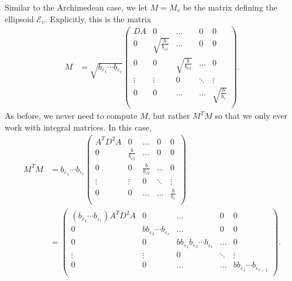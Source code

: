 Similar to the Archimedean case, we let $M=M_v$ be the matrix defining the ellipsoid $\mathcal{E}_{v}$. Explicitly, this is the matrix
\begin{align*}
M &=\sqrt{b_{\varepsilon_1}\cdots b_{\varepsilon_r}}\begin{pmatrix}
	DA & 0 & \dots & 0 & 0\\
	0 & \sqrt{\frac{b}{b_{\varepsilon 1}}} & \dots & 0 & 0\\
	0 & 0  & \sqrt{\frac{b}{b_{\varepsilon 2}}} & \dots & 0\\
	\vdots & \vdots &0 &  \ddots & \vdots\\ 
	0 & 0 & \dots & \dots & \sqrt{\frac{b}{b_{\varepsilon}}} \\
	\end{pmatrix}.
\end{align*}	
As before, we never need to compute $M$, but rather $M^TM$ so that we only ever work with integral matrices. In this case, 
\begin{align*}
M^TM &= b_{\varepsilon_1}\cdots b_{\varepsilon_r}\begin{pmatrix}
	A^TD^2A & 0 & \dots & 0 & 0\\
	0 & \frac{b}{b_{\varepsilon 1}} & \dots & 0 & 0\\
	0 & 0  & \frac{b}{b_{\varepsilon 2}} & \dots & 0\\
	\vdots & \vdots &0 &  \ddots & \vdots\\ 
	0 & 0 & \dots & \dots & \frac{b}{b_{\varepsilon}} \\
	\end{pmatrix}\\
	& = \begin{pmatrix}
	(b_{\varepsilon_1}\cdots b_{\varepsilon_r})A^TD^2A & 0 & \dots & 0 & 0\\
	0 & b b_{\varepsilon_2}\cdots b_{\varepsilon_r} & \dots & 0 & 0\\
	0 & 0  & bb_{\varepsilon_1}b_{\varepsilon_3}\cdots b_{\varepsilon_r} & \dots & 0\\
	\vdots & \vdots &0 &  \ddots & \vdots\\ 
	0 & 0 & \dots & \dots & bb_{\varepsilon_1}\cdots b_{\varepsilon_{r-1}} \\
	\end{pmatrix}.
\end{align*}	



